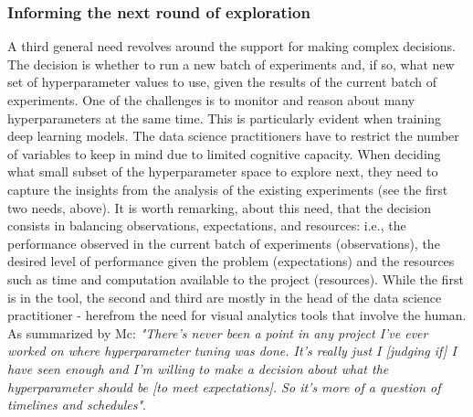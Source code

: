 \documentclass[preprint]{vgtc}        %
\begin{document}
\subsubsection{Informing the next round of exploration}
A third general need revolves around the support for making complex decisions. The decision is whether to run a new batch of experiments and, if so, what new set of hyperparameter values to use, given the results of the current batch of experiments. One of the challenges is to monitor and reason about many hyperparameters at the same time. This is particularly evident when training deep learning models. The data science practitioners have to restrict the number of variables to keep in mind due to limited cognitive capacity. When deciding what small subset of the hyperparameter space to explore next, they need to capture the insights from the analysis of the existing experiments (see the first two needs, above). It is worth remarking, about this need, that the decision consists in balancing observations, expectations, and resources: i.e., the performance observed in the current batch of experiments (observations), the desired level of performance given the problem (expectations) and the resources such as time and computation available to the project (resources). While the first is in the tool, the second and third are mostly in the head of the data science practitioner - herefrom the need for visual analytics tools that involve the human. As summarized by Mc: \textit{"There's never been a point in any project I've ever worked on where hyperparameter tuning was done. It's really just I [judging if] I have seen enough and I'm willing to make a decision about what the hyperparameter should be [to meet expectations]. So it’s more of a question of timelines and schedules"}.
\end{document}
